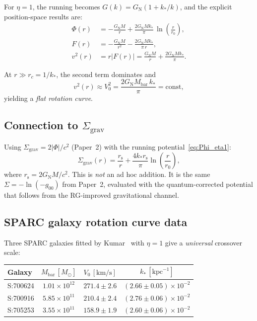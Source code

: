 \documentclass[aps,prd,preprint,superscriptaddress,longbibliography]{revtex4-2}
\newcommand{\GN}{G_{\mathrm{N}}}
\newcommand{\rs}{r_{\mathrm{s}}}
\begin{document}
For $\eta=1$, the running becomes $G(k) = \GN(1 + k_*/k)$, and the
explicit position-space results are:
\begin{align}
\Phi(r) &= -\frac{\GN M}{r}
+ \frac{2\GN M k_*}{\pi}\,\ln\!\left(\frac{r}{r_0}\right),
\label{eq:Phi_eta1}\\
F(r) &= -\frac{\GN M}{r^2} - \frac{2\GN M k_*}{\pi\, r},
\label{eq:F_eta1}\\
v^2(r) &= r|F(r)| = \frac{\GN M}{r}
+ \frac{2\GN M k_*}{\pi}.
\label{eq:v2}
\end{align}

At $r \gg r_c = 1/k_*$, the second term dominates and
\begin{equation}
v^2(r) \approx V_0^2 = \frac{2\GN M_{\mathrm{bar}}\, k_*}{\pi}
= \mathrm{const},
\label{eq:flat_v}
\end{equation}
yielding a \emph{flat rotation curve}.

\subsection{Connection to $\Sigma_{\mathrm{grav}}$}

Using $\Sigma_{\mathrm{grav}} = 2|\Phi|/c^2$ (Paper~2) with the
running potential~\eqref{eq:Phi_eta1}:
\begin{equation}
\Sigma_{\mathrm{grav}}(r) = \frac{\rs}{r}
+ \frac{4k_*\rs}{\pi}\ln\!\left(\frac{r}{r_0}\right),
\label{eq:Sigma_galactic}
\end{equation}
where $\rs = 2\GN M/c^2$.  This is \emph{not} an ad hoc addition.
It is the same $\Sigma = -\ln(-g_{00})$ from Paper~2, evaluated with
the quantum-corrected potential that follows from the RG-improved
gravitational channel.

\subsection{SPARC galaxy rotation curve data}

Three SPARC galaxies fitted by Kumar~\cite{Kumar2025} with $\eta=1$
give a \emph{universal} crossover scale:

\begin{center}
\begin{tabular}{lccc}
\toprule
Galaxy & $M_{\mathrm{bar}}\,[M_\odot]$ & $V_0\,[\mathrm{km/s}]$
  & $k_*\,[\mathrm{kpc}^{-1}]$ \\
\midrule
S:700624 & $1.01\times 10^{12}$ & $271.4\pm 2.6$
  & $(2.66\pm 0.05)\times 10^{-2}$ \\
S:700916 & $5.85\times 10^{11}$ & $210.4\pm 2.4$
  & $(2.76\pm 0.06)\times 10^{-2}$ \\
S:705253 & $3.55\times 10^{11}$ & $158.9\pm 1.9$
  & $(2.60\pm 0.06)\times 10^{-2}$ \\
\bottomrule
\end{tabular}
\end{center}
\end{document}
